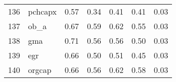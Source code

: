 \documentclass[12pt]{article}
\begin{document}
\begin{footnotesize}
\begin{longtable}{rl|c|c|c|c|c}
				136                  & pchcapx                     & 0.57                             & 0.34                                                                                          & 0.41                                                                                          & 0.41                                                                                          & 0.03                                                                                                   \\
				137                  & ob\_a                       & 0.67                             & 0.59                                                                                          & 0.62                                                                                          & 0.55                                                                                          & 0.03                                                                                                   \\
				138                  & gma                         & 0.71                             & 0.56                                                                                          & 0.56                                                                                          & 0.50                                                                                          & 0.03                                                                                                   \\
				139                  & egr                         & 0.66                             & 0.50                                                                                          & 0.51                                                                                          & 0.45                                                                                          & 0.03                                                                                                   \\
				140                  & orgcap                      & 0.66                             & 0.56                                                                                          & 0.62                                                                                          & 0.58                                                                                          & 0.03                                                                                                   \\

\end{longtable}
\end{footnotesize}
\end{document}

